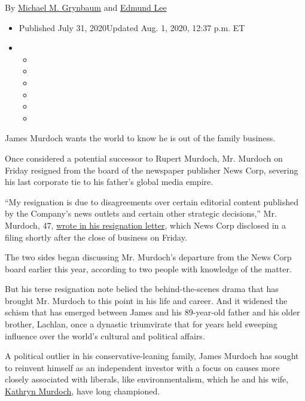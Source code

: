 By
\href{https://www.nytimes3xbfgragh.onion/by/michael-m-grynbaum}{Michael
M. Grynbaum} and
\href{https://www.nytimes3xbfgragh.onion/by/edmund-lee}{Edmund Lee}

\begin{itemize}
\item
  Published July 31, 2020Updated Aug. 1, 2020, 12:37 p.m. ET
\item
  \begin{itemize}
  \item
  \item
  \item
  \item
  \item
  \item
  \end{itemize}
\end{itemize}

James Murdoch wants the world to know he is out of the family business.

Once considered a potential successor to Rupert Murdoch, Mr. Murdoch on
Friday resigned from the board of the newspaper publisher News Corp,
severing his last corporate tie to his father's global media empire.

``My resignation is due to disagreements over certain editorial content
published by the Company's news outlets and certain other strategic
decisions,'' Mr. Murdoch, 47,
\href{https://int.graylady3jvrrxbe.onion/data/documenttools/james-murdoch-s-resignation-letter/5d16f07153370f9d/full.pdf}{wrote
in his resignation letter}, which News Corp disclosed in a filing
shortly after the close of business on Friday.

The two sides began discussing Mr. Murdoch's departure from the News
Corp board earlier this year, according to two people with knowledge of
the matter.

But his terse resignation note belied the behind-the-scenes drama that
has brought Mr. Murdoch to this point in his life and career. And it
widened the schism that has emerged between James and his 89-year-old
father and his older brother, Lachlan, once a dynastic triumvirate that
for years held sweeping influence over the world's cultural and
political affairs.

A political outlier in his conservative-leaning family, James Murdoch
has sought to reinvent himself as an independent investor with a focus
on causes more closely associated with liberals, like environmentalism,
which he and his wife,
\href{https://www.nytimes3xbfgragh.onion/2019/09/26/climate/kathryn-murdoch-climate-change-voting.html}{Kathryn
Murdoch}, have long championed.

